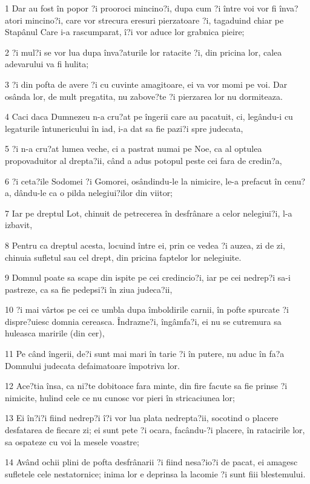 \par 1 Dar au fost în popor ?i prooroci mincino?i, dupa cum ?i între voi vor fi înva?atori mincino?i, care vor strecura eresuri pierzatoare ?i, tagaduind chiar pe Stapânul Care i-a rascumparat, î?i vor aduce lor grabnica pieire;
\par 2 ?i mul?i se vor lua dupa înva?aturile lor ratacite ?i, din pricina lor, calea adevarului va fi hulita;
\par 3 ?i din pofta de avere ?i cu cuvinte amagitoare, ei va vor momi pe voi. Dar osânda lor, de mult pregatita, nu zabove?te ?i pierzarea lor nu dormiteaza.
\par 4 Caci daca Dumnezeu n-a cru?at pe îngerii care au pacatuit, ci, legându-i cu legaturile întunericului în iad, i-a dat sa fie pazi?i spre judecata,
\par 5 ?i n-a cru?at lumea veche, ci a pastrat numai pe Noe, ca al optulea propovaduitor al drepta?ii, când a adus potopul peste cei fara de credin?a,
\par 6 ?i ceta?ile Sodomei ?i Gomorei, osândindu-le la nimicire, le-a prefacut în cenu?a, dându-le ca o pilda nelegiui?ilor din viitor;
\par 7 Iar pe dreptul Lot, chinuit de petrecerea în desfrânare a celor nelegiui?i, l-a izbavit,
\par 8 Pentru ca dreptul acesta, locuind între ei, prin ce vedea ?i auzea, zi de zi, chinuia sufletul sau cel drept, din pricina faptelor lor nelegiuite.
\par 9 Domnul poate sa scape din ispite pe cei credincio?i, iar pe cei nedrep?i sa-i pastreze, ca sa fie pedepsi?i în ziua judeca?ii,
\par 10 ?i mai vârtos pe cei ce umbla dupa îmboldirile carnii, în pofte spurcate ?i dispre?uiesc domnia cereasca. Îndrazne?i, îngâmfa?i, ei nu se cutremura sa huleasca maririle (din cer),
\par 11 Pe când îngerii, de?i sunt mai mari în tarie ?i în putere, nu aduc în fa?a Domnului judecata defaimatoare împotriva lor.
\par 12 Ace?tia însa, ca ni?te dobitoace fara minte, din fire facute sa fie prinse ?i nimicite, hulind cele ce nu cunosc vor pieri în stricaciunea lor;
\par 13 Ei în?i?i fiind nedrep?i î?i vor lua plata nedrepta?ii, socotind o placere desfatarea de fiecare zi; ei sunt pete ?i ocara, facându-?i placere, în ratacirile lor, sa ospateze cu voi la mesele voastre;
\par 14 Având ochii plini de pofta desfrânarii ?i fiind nesa?io?i de pacat, ei amagesc sufletele cele nestatornice; inima lor e deprinsa la lacomie ?i sunt fiii blestemului.
